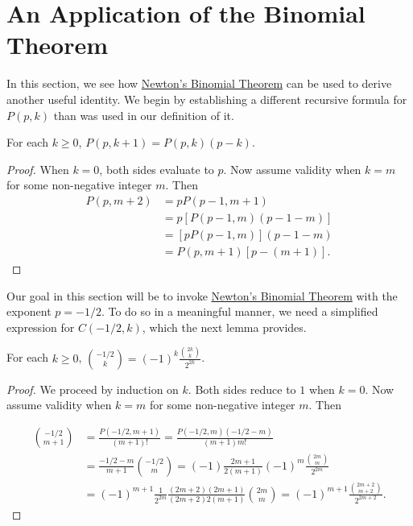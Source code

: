 \section{An Application of the Binomial Theorem}\label{s:genfunction:binom-app}

In this section, we see how \hyperref[thm:newton-binomial]{Newton's
  Binomial Theorem} can be used to derive another useful identity. We
begin by establishing a different recursive formula for $P(p,k)$ than
was used in our definition of it.

\begin{lemma}
For each $k\ge0$,
$P(p,k+1)=P(p,k)(p-k)$.
\end{lemma}
\begin{proof}
When $k=0$, both sides evaluate to $p$.  Now assume validity when
$k=m$ for some non-negative integer $m$.  Then
\begin{align*}
P(p,m+2)&=pP(p-1,m+1)\\
        &= p[P(p-1,m)(p-1-m)]\\
        &=[pP(p-1,m)](p-1-m)\\
        &=P(p,m+1)[p-(m+1)].
\end{align*}
\end{proof}

Our goal in this section will be to invoke
\hyperref[thm:newton-binomial]{Newton's Binomial Theorem} with the
exponent $p=-1/2$. To do so in a meaningful manner, we need a
simplified expression for $C(-1/2,k)$, which the next lemma provides.

\begin{lemma}\label{l:newbinom}
For each $k\ge0$,
$\displaystyle\binom{-1/2}{k}=(-1)^k\frac{\binom{2k}{k}}{2^{2k}}$.
\end{lemma}
\begin{proof}
We proceed by induction on $k$.  Both sides reduce to $1$ when
$k=0$.  Now assume validity when $k=m$ for some non-negative
integer $m$.  Then

\begin{align*}
\binom{-1/2}{m+1} &=\frac{P(-1/2,m+1)}{(m+1)!}
                  =\frac{P(-1/2,m)(-1/2-m)}{(m+1)m!}\\
                  &=\frac{-1/2-m}{m+1}\binom{-1/2}{m}
                  =(-1)\frac{2m+1}{2(m+1)}(-1)^m\frac{\binom{2m}{m}}{2^{2m}}\\
                  &=(-1)^{m+1}\frac{1}{2^{2m}}\frac{(2m+2)(2m+1)}{(2m+2)2(m+1)}\binom{2m}{m}=
                  (-1)^{m+1}\frac{\binom{2m+2}{m+2}}{2^{2m+2}}.
\end{align*}
\end{proof}


